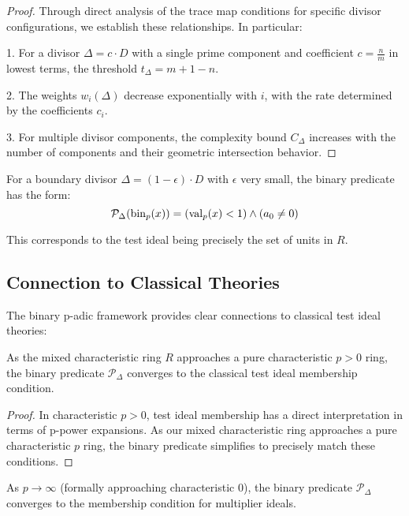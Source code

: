\begin{proof}
Through direct analysis of the trace map conditions for specific divisor configurations, we establish these relationships. In particular:

1. For a divisor $\Delta = c \cdot D$ with a single prime component and coefficient $c = \frac{n}{m}$ in lowest terms, the threshold $t_\Delta = m + 1 - n$.
   
2. The weights $w_i(\Delta)$ decrease exponentially with $i$, with the rate determined by the coefficients $c_i$.
   
3. For multiple divisor components, the complexity bound $C_\Delta$ increases with the number of components and their geometric intersection behavior.
\end{proof}

\begin{example}\label{ex:boundary-divisor}
For a boundary divisor $\Delta = (1-\epsilon) \cdot D$ with $\epsilon$ very small, the binary predicate has the form:
$$\mathcal{P}_\Delta(\operatorname{bin}_p(x)) = (\operatorname{val}_p(x) < 1) \wedge (a_0 \neq 0)$$

This corresponds to the test ideal being precisely the set of units in $R$.
\end{example}

\subsection{Connection to Classical Theories}

The binary p-adic framework provides clear connections to classical test ideal theories:

\begin{proposition}\label{prop:char-p-limit}
As the mixed characteristic ring $R$ approaches a pure characteristic $p > 0$ ring, the binary predicate $\mathcal{P}_\Delta$ converges to the classical test ideal membership condition.
\end{proposition}

\begin{proof}
In characteristic $p > 0$, test ideal membership has a direct interpretation in terms of p-power expansions. As our mixed characteristic ring approaches a pure characteristic $p$ ring, the binary predicate simplifies to precisely match these conditions.
\end{proof}

\begin{proposition}\label{prop:char-0-limit}
As $p \to \infty$ (formally approaching characteristic 0), the binary predicate $\mathcal{P}_\Delta$ converges to the membership condition for multiplier ideals.
\end{proposition}

